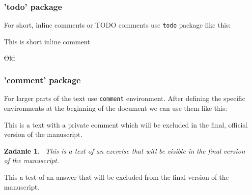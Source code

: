 \documentclass[11pt]{article}
\newcommand{\MBp}[1]{{\leavevmode\color{red!75}#1}}
\newcommand{\MBe}[2]{{\leavevmode\color{red!75}{#1}}{{\leavevmode\color{red!50}\st{#2}}}}
\newtheorem{exercise}{Zadanie }
\begin{document}
\subsubsection{'todo' package}
For short, inline comments or TODO comments use \verb|todo| package like this:

\MBp{This is short inline comment}

\MBe{New}{Old}

\subsubsection{'comment' package}
For larger parts of the text use \verb|comment| environment. After defining the specific environments at the beginning of the document we can use them like this:

\vspace{0.5cm}

\begin{private-comment}
This is a text with a private comment which will be excluded in the final, official version of the manuscript.
\end{private-comment}

\vspace{0.5cm}

\begin{exercise}\
This is a text of an exercise that will be visible in the final version of the manuscript.

\end{exercise}

\begin{answers}
This a test of an answer that will be excluded from the final version of the manuscript.
\end{answers}
\end{document}
